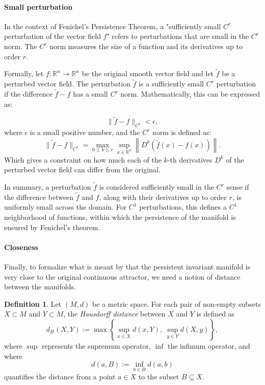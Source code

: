 \documentclass{article} %
\newcounter{ct}
\theoremstyle{definition}
\newtheorem{definition}{Definition}
\theoremstyle{remark}
\begin{document}
\paragraph{Small perturbation}
In the context of Fenichel's Persistence Theorem, a "sufficiently small \( C^r \) perturbation of the vector field \( f \)" refers to perturbations that are small in the \( C^r \) norm. The \( C^r \) norm measures the size of a function and its derivatives up to order \( r \).

Formally, let \( f: \mathbb{R}^n \rightarrow \mathbb{R}^n \) be the original smooth vector field and let \( \tilde{f} \) be a perturbed vector field. The perturbation \( \tilde{f} \) is a sufficiently small \( C^r \) perturbation if the difference \( \tilde{f} - f \) has a small \( C^r \) norm. Mathematically, this can be expressed as:

\[ \| \tilde{f} - f \|_{C^r} < \epsilon, \]
where \( \epsilon \) is a small positive number, and the \( C^r \) norm is defined as:
\[ \| \tilde{f} - f \|_{C^r} = \max_{0 \leq k \leq r} \sup_{x \in \mathbb{R}^n} \left\| D^k (\tilde{f}(x) - f(x)) \right\|. \]
Which gives a constraint on how much each of the \(k\)-th derivatives \( D^k \) of the perturbed vector field can differ from the original.

In summary, a perturbation \( \tilde{f} \) is considered sufficiently small in the \( C^r \) sense if the difference between \( \tilde{f} \) and \( f \), along with their derivatives up to order \( r \), is uniformly small across the domain.
For \(C^1\) perturbations, this defines a \(C^1\)  neighborhood of functions, within which the persistence of the manifold is ensured by Fenichel's theorem.



\paragraph{Closeness}
Finally, to formalize what is meant by that the persistent invariant manifold is very close to the original continuous attractor, we need a notion of distance between the manifolds.
\begin{definition}
Let \((M, d)\) be a metric space. For each pair of non-empty subsets \(X \subset M\) and \(Y \subset M\), the \emph{Hausdorff distance} between \(X\) and \(Y\) is defined as
\[
d_H(X, Y) := \max \left\{ \sup_{x \in X} d(x, Y), \ \sup_{y \in Y} d(X, y) \right\},
\]
where \(\sup\) represents the supremum operator, \(\inf\) the infimum operator, and where
\[
d(a, B) := \inf_{b \in B} d(a, b)
\]
quantifies the distance from a point \(a \in X\) to the subset \(B \subseteq X\).
\end{definition}
\end{document}
